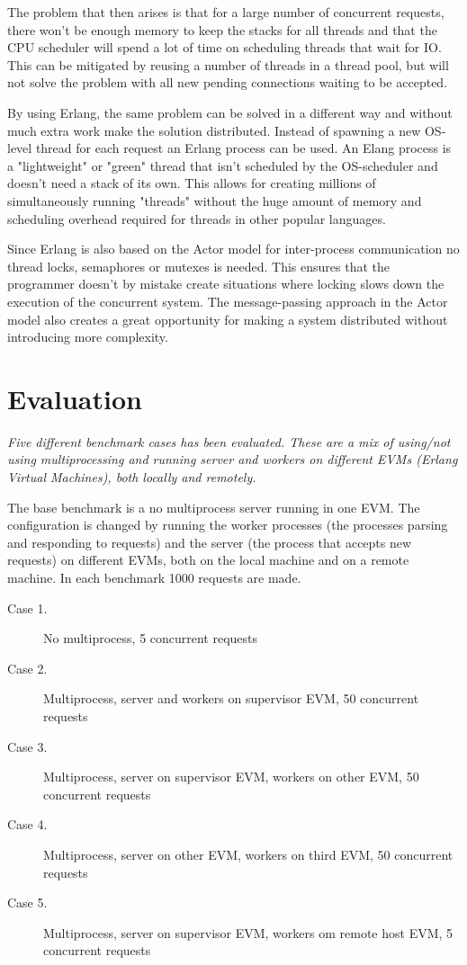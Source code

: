 \documentclass[a4paper, 11pt]{article}
\begin{document}
The problem that then arises is that for a large number of concurrent requests, there won't be enough
memory to keep the stacks for all threads and that the CPU scheduler will spend a lot of time
on scheduling threads that wait for IO.
This can be mitigated by reusing a number of threads in a thread pool, but will not solve the problem
with all new pending connections waiting to be accepted.

By using Erlang, the same problem can be solved in a different way and without much extra work make
 the solution distributed.
Instead of spawning a new OS-level thread for each request an Erlang process can be used. An Elang process
is a "lightweight" or "green" thread that isn't scheduled by the OS-scheduler and doesn't need a stack
 of its own. This allows for creating millions of simultaneously running "threads" without the
  huge amount of memory and scheduling overhead required for threads in other popular languages.

Since Erlang is also based on the Actor model for inter-process communication no thread locks, semaphores
or mutexes is needed. This ensures that the programmer doesn't by mistake create situations where locking
 slows down the execution of the concurrent system. The message-passing approach in the Actor model
 also creates a great opportunity for making a system distributed without introducing more complexity.

\section{Evaluation}

\textit{Five different benchmark cases has been evaluated. These are a mix of using/not using multiprocessing and
running server and workers on different EVMs (Erlang Virtual Machines), both locally and remotely.}

The base benchmark is a no multiprocess server running in one EVM. The configuration is changed by running the worker
processes (the processes parsing and responding to requests) and the server (the process that accepts new requests) on
 different EVMs, both on the local machine and on a remote machine.
 In each benchmark 1000 requests are made.

\begin{description}
  \item[Case 1.] No multiprocess, 5 concurrent requests
  \item[Case 2.] Multiprocess, server and workers on supervisor EVM, 50 concurrent requests
  \item[Case 3.] Multiprocess, server on supervisor EVM, workers on other EVM, 50 concurrent requests
  \item[Case 4.] Multiprocess, server on other EVM, workers on third EVM, 50 concurrent requests
  \item[Case 5.] Multiprocess, server on supervisor EVM, workers om remote host EVM, 5 concurrent requests
\end{description}
\end{document}
